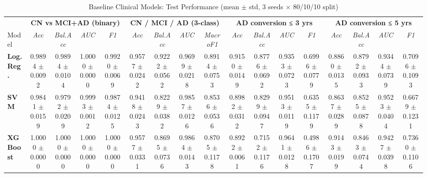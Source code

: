 \begin{table}[ht]
\centering
\caption{Baseline Clinical Models: Test Performance (mean $\pm$ std, 3 seeds $\times$ 80/10/10 split)}
\label{tab:baseline_models}
\small\setlength{\tabcolsep}{5pt}
\begin{tabular}{l@{\hspace{3pt}}|@{\hspace{3pt}}cccc@{\hspace{3pt}}|@{\hspace{3pt}}cccc@{\hspace{3pt}}|@{\hspace{3pt}}cccc@{\hspace{3pt}}|@{\hspace{3pt}}cccc}
\toprule
 & \multicolumn{4}{c}{\textbf{CN vs MCI+AD (binary)}} & \multicolumn{4}{c}{\textbf{CN / MCI / AD (3-class)}} & \multicolumn{4}{c}{\textbf{AD conversion ≤ 3 yrs}} & \multicolumn{4}{c}{\textbf{AD conversion ≤ 5 yrs}} \\
\cmidrule(lr){2-5}\cmidrule(lr){6-9}\cmidrule(lr){10-13}\cmidrule(lr){14-17}
Model & \textit{Acc} & \textit{Bal.Acc} & \textit{AUC} & \textit{F1} & \textit{Acc} & \textit{Bal.Acc} & \textit{AUC} & \textit{MacroF1} & \textit{Acc} & \textit{Bal.Acc} & \textit{AUC} & \textit{F1} & \textit{Acc} & \textit{Bal.Acc} & \textit{AUC} & \textit{F1} \\
\midrule
\textbf{Log. Reg.} & 0.9894 $\pm$ 0.0092 & 0.9894 $\pm$ 0.0104 & 1.0000 $\pm$ 0.0000 & 0.9920 $\pm$ 0.0069 & 0.9577 $\pm$ 0.0242 & 0.9222 $\pm$ 0.0562 & 0.9699 $\pm$ 0.0218 & 0.8914 $\pm$ 0.0753 & 0.9150 $\pm$ 0.0149 & 0.8776 $\pm$ 0.0692 & 0.9353 $\pm$ 0.0723 & 0.6996 $\pm$ 0.0779 & 0.8860 $\pm$ 0.0135 & 0.8792 $\pm$ 0.0933 & 0.9344 $\pm$ 0.0739 & 0.7096 $\pm$ 0.1093 \\
\textbf{SVM} & 0.9841 $\pm$ 0.0159 & 0.9792 $\pm$ 0.0209 & 0.9993 $\pm$ 0.0012 & 0.9874 $\pm$ 0.0125 & 0.9418 $\pm$ 0.0243 & 0.8229 $\pm$ 0.0382 & 0.9857 $\pm$ 0.0126 & 0.8536 $\pm$ 0.0536 & 0.8982 $\pm$ 0.0312 & 0.8299 $\pm$ 0.0947 & 0.9513 $\pm$ 0.0119 & 0.6355 $\pm$ 0.1179 & 0.8637 $\pm$ 0.0289 & 0.8525 $\pm$ 0.0878 & 0.9523 $\pm$ 0.0404 & 0.6679 $\pm$ 0.1231 \\
\textbf{XGBoost} & 1.0000 $\pm$ 0.0000 & 1.0000 $\pm$ 0.0000 & 1.0000 $\pm$ 0.0000 & 1.0000 $\pm$ 0.0000 & 0.9577 $\pm$ 0.0331 & 0.8695 $\pm$ 0.0736 & 0.9864 $\pm$ 0.0143 & 0.8705 $\pm$ 0.1178 & 0.8922 $\pm$ 0.0061 & 0.7152 $\pm$ 0.1176 & 0.9641 $\pm$ 0.0128 & 0.4986 $\pm$ 0.1707 & 0.9143 $\pm$ 0.0199 & 0.8463 $\pm$ 0.0744 & 0.9427 $\pm$ 0.0398 & 0.7360 $\pm$ 0.1106 \\
\bottomrule
\end{tabular}
\end{table}